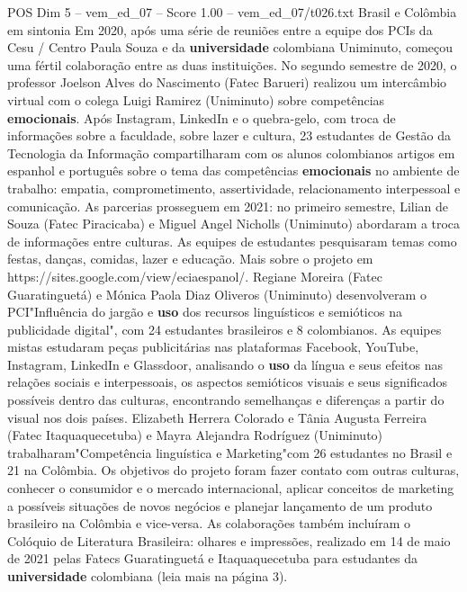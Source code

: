 \begin{textsample}{POS Dim 5 – vem\_ed\_07 – Score 1.00 – vem\_ed\_07/t026.txt}  \label{ex:f5_pos_155}
Brasil e Colômbia em sintonia Em 2020, após uma série de reuniões entre a equipe dos PCIs da Cesu / Centro Paula Souza e da \textbf{universidade} colombiana Uniminuto, começou uma fértil colaboração entre as duas instituições.
No segundo semestre de 2020, o professor Joelson Alves do Nascimento (Fatec Barueri) realizou um intercâmbio virtual com o colega Luigi Ramirez (Uniminuto) sobre competências \textbf{emocionais}.
Após Instagram, LinkedIn e o quebra-gelo, com troca de informações sobre a faculdade, sobre lazer e cultura, 23 estudantes de Gestão da Tecnologia da Informação compartilharam com os alunos colombianos artigos em espanhol e português sobre o tema das competências \textbf{emocionais} no ambiente de trabalho: empatia, comprometimento, assertividade, relacionamento interpessoal e comunicação.
As parcerias prosseguem em 2021: no primeiro semestre, Lilian de Souza (Fatec Piracicaba) e Miguel Angel Nicholls (Uniminuto) abordaram a troca de informações entre culturas.
As equipes de estudantes pesquisaram temas como festas, danças, comidas, lazer e educação.
Mais sobre o projeto em https://sites.google.com/view/eciaespanol/.
Regiane Moreira (Fatec Guaratinguetá) e Mónica Paola Diaz Oliveros (Uniminuto) desenvolveram o PCI"Influência do jargão e \textbf{uso} dos recursos linguísticos e semióticos na publicidade digital", com 24 estudantes brasileiros e 8 colombianos.
As equipes mistas estudaram peças publicitárias nas plataformas Facebook, YouTube, Instagram, LinkedIn e Glassdoor, analisando o \textbf{uso} da língua e seus efeitos nas relações sociais e interpessoais, os aspectos semióticos visuais e seus significados possíveis dentro das culturas, encontrando semelhanças e diferenças a partir do visual nos dois países.
Elizabeth Herrera Colorado e Tânia Augusta Ferreira (Fatec Itaquaquecetuba) e Mayra Alejandra Rodríguez (Uniminuto) trabalharam"Competência linguística e Marketing"com 26 estudantes no Brasil e 21 na Colômbia.
Os objetivos do projeto foram fazer contato com outras culturas, conhecer o consumidor e o mercado internacional, aplicar conceitos de marketing a possíveis situações de novos negócios e planejar lançamento de um produto brasileiro na Colômbia e vice-versa.
As colaborações também incluíram o Colóquio de Literatura Brasileira: olhares e impressões, realizado em 14 de maio de 2021 pelas Fatecs Guaratinguetá e Itaquaquecetuba para estudantes da \textbf{universidade} colombiana (leia mais na página 3).

\end{textsample}
